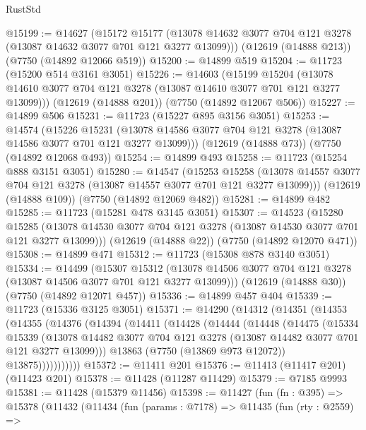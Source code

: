 \begin{lexlean}{RustStd}
\begin{coremodule}
@15199 := @14627
    (@15172
      @15177
      (@13078 @14632 @3077 @704 @121 @3278 (@13087 @14632 @3077 @701 @121 @3277 @13099)))
    (@12619 (@14888 @213))
    (@7750 (@14892 @12066 @519))
@15200 := @14899 @519
@15204 := @11723 (@15200 @514 @3161 @3051)
@15226 := @14603
    (@15199
      @15204
      (@13078 @14610 @3077 @704 @121 @3278 (@13087 @14610 @3077 @701 @121 @3277 @13099)))
    (@12619 (@14888 @201))
    (@7750 (@14892 @12067 @506))
@15227 := @14899 @506
@15231 := @11723 (@15227 @895 @3156 @3051)
@15253 := @14574
    (@15226
      @15231
      (@13078 @14586 @3077 @704 @121 @3278 (@13087 @14586 @3077 @701 @121 @3277 @13099)))
    (@12619 (@14888 @73))
    (@7750 (@14892 @12068 @493))
@15254 := @14899 @493
@15258 := @11723 (@15254 @888 @3151 @3051)
@15280 := @14547
    (@15253
      @15258
      (@13078 @14557 @3077 @704 @121 @3278 (@13087 @14557 @3077 @701 @121 @3277 @13099)))
    (@12619 (@14888 @109))
    (@7750 (@14892 @12069 @482))
@15281 := @14899 @482
@15285 := @11723 (@15281 @478 @3145 @3051)
@15307 := @14523
    (@15280
      @15285
      (@13078 @14530 @3077 @704 @121 @3278 (@13087 @14530 @3077 @701 @121 @3277 @13099)))
    (@12619 (@14888 @22))
    (@7750 (@14892 @12070 @471))
@15308 := @14899 @471
@15312 := @11723 (@15308 @878 @3140 @3051)
@15334 := @14499
    (@15307
      @15312
      (@13078 @14506 @3077 @704 @121 @3278 (@13087 @14506 @3077 @701 @121 @3277 @13099)))
    (@12619 (@14888 @30))
    (@7750 (@14892 @12071 @457))
@15336 := @14899 @457 @404
@15339 := @11723 (@15336 @3125 @3051)
@15371 := @14290
    (@14312
      (@14351
        (@14353
          (@14355
            (@14376
              (@14394
                (@14411
                  (@14428
                    (@14444
                      (@14448
                        (@14475
                          (@15334
                            @15339
                            (@13078
                              @14482
                              @3077
                              @704
                              @121
                              @3278
                              (@13087 @14482 @3077 @701 @121 @3277 @13099)))
                          @13863
                          (@7750 (@13869 @973 @12072))
                          @13875)))))))))))
@15372 := @11411 @201
@15376 := @11413 (@11417 @201) (@11423 @201)
@15378 := @11428 (@11287 @11429)
@15379 := @7185 @9993
@15381 := @11428 (@15379 @11456)
@15398 := @11427
    (fun (fn : @395) =>
    @15378
      (@11432
        (@11434
          (fun (params : @7178) =>
          @11435
            (fun (rty : @2559) =>

\end{coremodule}
\end{lexlean}
